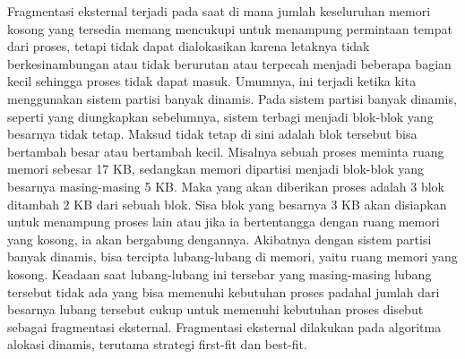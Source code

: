 Fragmentasi eksternal terjadi pada saat di mana jumlah keseluruhan memori kosong yang tersedia memang mencukupi untuk menampung permintaan tempat dari proses, tetapi tidak dapat dialokasikan karena letaknya tidak berkesinambungan atau tidak berurutan atau terpecah menjadi beberapa bagian kecil sehingga proses tidak dapat masuk. 
Umumnya, ini terjadi ketika kita menggunakan sistem partisi banyak dinamis. Pada sistem partisi banyak dinamis, seperti yang diungkapkan sebelumnya, sistem terbagi menjadi blok-blok yang besarnya tidak tetap.
Maksud tidak tetap di sini adalah blok tersebut bisa bertambah besar atau bertambah kecil. 
Misalnya sebuah proses meminta ruang memori sebesar 17 KB, sedangkan memori dipartisi menjadi blok-blok yang besarnya masing-masing 5 KB. Maka yang akan diberikan proses adalah 3 blok ditambah 2 KB dari sebuah blok. Sisa blok yang besarnya 3 KB akan disiapkan untuk menampung proses lain atau jika ia bertentangga dengan ruang memori yang kosong, ia akan bergabung dengannya.
Akibatnya dengan sistem partisi banyak dinamis, bisa tercipta lubang-lubang di memori, yaitu ruang memori yang kosong. Keadaan saat lubang-lubang ini tersebar yang masing-masing lubang tersebut tidak ada yang bisa memenuhi kebutuhan proses padahal jumlah dari besarnya lubang tersebut cukup untuk memenuhi kebutuhan proses disebut sebagai fragmentasi eksternal. Fragmentasi eksternal dilakukan pada algoritma alokasi dinamis, terutama strategi first-fit dan best-fit.



